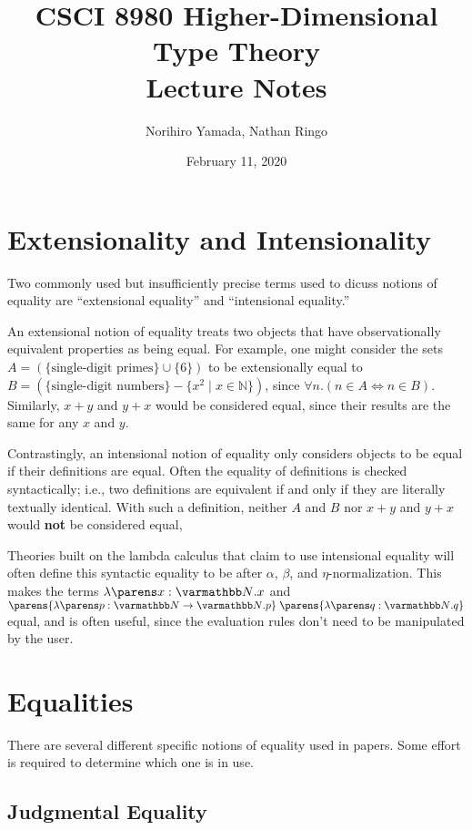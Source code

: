 \documentclass[11pt]{article}
\title{CSCI 8980 Higher-Dimensional Type Theory\\ Lecture Notes}
\author{Norihiro Yamada, Nathan Ringo}
\date{February 11, 2020}
\begin{document}
\maketitle

\section{Extensionality and Intensionality}
Two commonly used but insufficiently precise terms used to dicuss notions of equality are ``extensional equality'' and ``intensional equality.''

An extensional notion of equality treats two objects that have observationally equivalent properties as being equal. For example, one might consider the sets $A = \left(\{\textrm{single-digit primes}\} \cup \{6\}\right)$ to be extensionally equal to $B = \left(\{\textrm{single-digit numbers}\} - \{x^2 \mid x \in \mathbb{N}\}\right)$, since $\forall n. \left(n \in A \iff n \in B\right)$. Similarly, $x + y$ and $y + x$ would be considered equal, since their results are the same for any $x$ and $y$.

Contrastingly, an intensional notion of equality only considers objects to be equal if their definitions are equal. Often the equality of definitions is checked syntactically; i.e., two definitions are equivalent if and only if they are literally textually identical. With such a definition, neither $A$ and $B$ nor $x + y$ and $y + x$ would \textbf{not} be considered equal,

Theories built on the lambda calculus that claim to use intensional equality will often define this syntactic equality to be after $\alpha$, $\beta$, and $\eta$-normalization. This makes the terms $\lam{x}[\nattype]{x}$ and $\app{\parens{\lam{p}[\funtype{\nattype}{\nattype}]{p}}}{\parens{\lam{q}[\nattype]{q}}}$ equal, and is often useful, since the evaluation rules don't need to be manipulated by the user.

\section{Equalities}

There are several different specific notions of equality used in papers. Some effort is required to determine which one is in use.

\subsection{Judgmental Equality}
\end{document}
